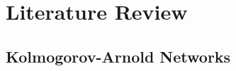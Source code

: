 \documentclass[12pt,a4paper,oneside]{article}
\begin{document}
\section{Literature Review}\label{sec:literature}

%
%


\subsection{Kolmogorov-Arnold Networks}\label{subsec:lit_kan}
\end{document}

